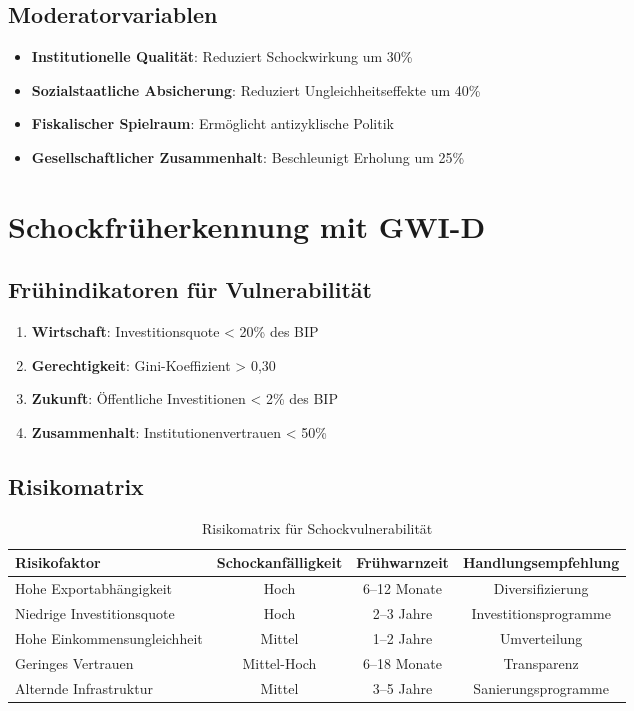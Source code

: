 \subsection{Moderatorvariablen}

\begin{itemize}
\item \textbf{Institutionelle Qualität}: Reduziert Schockwirkung um 30\%
\item \textbf{Sozialstaatliche Absicherung}: Reduziert Ungleichheitseffekte um 40\%
\item \textbf{Fiskalischer Spielraum}: Ermöglicht antizyklische Politik
\item \textbf{Gesellschaftlicher Zusammenhalt}: Beschleunigt Erholung um 25\%
\end{itemize}

\section{Schockfrüherkennung mit GWI-D}

\subsection{Frühindikatoren für Vulnerabilität}

\begin{enumerate}
\item \textbf{Wirtschaft}: Investitionsquote < 20\% des BIP
\item \textbf{Gerechtigkeit}: Gini-Koeffizient > 0,30
\item \textbf{Zukunft}: Öffentliche Investitionen < 2\% des BIP
\item \textbf{Zusammenhalt}: Institutionenvertrauen < 50\%
\end{enumerate}

\subsection{Risikomatrix}

\begin{table}[ht]
\centering
\begin{tabular}{lccc}
\toprule
\textbf{Risikofaktor} & \textbf{Schockanfälligkeit} & \textbf{Frühwarnzeit} & \textbf{Handlungsempfehlung} \\
\midrule
Hohe Exportabhängigkeit & Hoch & 6--12 Monate & Diversifizierung \\
Niedrige Investitionsquote & Hoch & 2--3 Jahre & Investitionsprogramme \\
Hohe Einkommensungleichheit & Mittel & 1--2 Jahre & Umverteilung \\
Geringes Vertrauen & Mittel-Hoch & 6--18 Monate & Transparenz \\
Alternde Infrastruktur & Mittel & 3--5 Jahre & Sanierungsprogramme \\
\bottomrule
\end{tabular}
\caption{Risikomatrix für Schockvulnerabilität}
\label{tab:risikomatrix}
\end{table}

